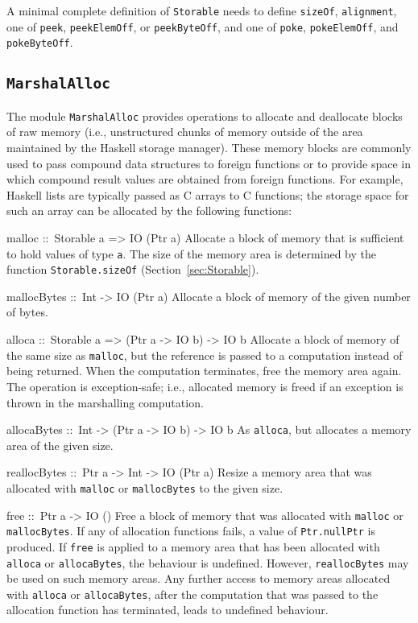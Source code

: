 \documentclass[a4paper,twosides]{article}
\makeatletter
\newcommand{\code}[1]{\texttt{#1}}      %
\newenvironment{codedesc}{%
  \list{}{\labelwidth\z@
    \let\makelabel\codedesclabel}
  }{%
  \endlist
  }
\newcommand*{\codedesclabel}[1]{%
  \hspace{-\leftmargin}
  \parbox[b]{\labelwidth}{\makebox[0pt][l]{\code{#1}}\\}\hfil\relax
  }
\makeatother
\begin{document}
A minimal complete definition of \code{Storable} needs to define
\code{sizeOf}, \code{alignment}, one of \code{peek}, \code{peekElemOff}, or
\code{peekByteOff}, and one of \code{poke}, \code{pokeElemOff}, and
\code{pokeByteOff}.

\subsection{\code{MarshalAlloc}}
\label{sec:MarshalAlloc}

The module \code{MarshalAlloc} provides operations to allocate and deallocate
blocks of raw memory (i.e., unstructured chunks of memory outside of the area
maintained by the Haskell storage manager).  These memory blocks are commonly
used to pass compound data structures to foreign functions or to provide space
in which compound result values are obtained from foreign functions.  For
example, Haskell lists are typically passed as C arrays to C functions; the
storage space for such an array can be allocated by the following functions:
%
\begin{codedesc}
\item[malloc ::\ Storable a => IO (Ptr a)] Allocate a block of memory that is
  sufficient to hold values of type \code{a}.  The size of the memory area is
  determined by the function \code{Storable.sizeOf}
  (Section~\ref{sec:Storable}).

\item[mallocBytes ::\ Int -> IO (Ptr a)] Allocate a block of memory of the
  given number of bytes.
  
\item[alloca ::\ Storable a => (Ptr a -> IO b) -> IO b] Allocate a block of
  memory of the same size as \code{malloc}, but the reference is passed to a
  computation instead of being returned.  When the computation terminates,
  free the memory area again.  The operation is exception-safe; i.e.,
  allocated memory is freed if an exception is thrown in the marshalling
  computation.

\item[allocaBytes ::\ Int -> (Ptr a -> IO b) -> IO b] As \code{alloca}, but
  allocates a memory area of the given size.
  
\item[reallocBytes ::\ Ptr a -> Int -> IO (Ptr a)] Resize a memory area that
  was allocated with \code{malloc} or \code{mallocBytes} to the given size.

\item[free ::\ Ptr a -> IO ()] Free a block of memory that was allocated with
  \code{malloc} or \code{mallocBytes}.
\end{codedesc}
%
If any of allocation functions fails, a value of \code{Ptr.nullPtr} is
produced.  If \code{free} is applied to a memory area that has been allocated
with \code{alloca} or \code{allocaBytes}, the behaviour is undefined.
However, \code{reallocBytes} may be used on such memory areas.  Any further
access to memory areas allocated with \code{alloca} or \code{allocaBytes},
after the computation that was passed to the allocation function has
terminated, leads to undefined behaviour.
\end{document}
